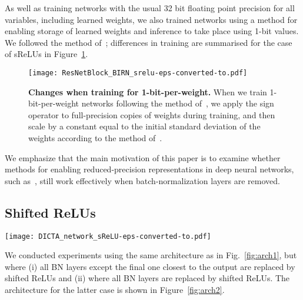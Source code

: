 \documentclass[conference]{IEEEtran}
\begin{document}
As well as training networks with the usual 32 bit floating point precision for all variables, including learned weights, we also trained networks using a method for enabling storage of learned weights and inference to take place using 1-bit values. We followed the method of~\cite{McDonnell.18}; differences in training are summarised for the case of sReLUs in Figure~\ref{fig:birn}.

\begin{figure}[h]
\begin{center}
{\texttt{[image: ResNetBlock\_BIRN\_srelu-eps-converted-to.pdf]}}
\end{center}
\caption{{\bf  Changes when training for 1-bit-per-weight.} When we train 1-bit-per-weight networks following the method of~\cite{McDonnell.18}, we apply the sign operator to full-precision copies of weights during training, and then scale by a constant equal to the initial standard deviation of the weights according to the method of~\cite{He.15}.}\label{fig:birn}
\end{figure}

We emphasize that the main motivation of this paper is to examine whether methods for enabling reduced-precision representations in deep neural networks, such as~\cite{McDonnell.18}, still work effectively when batch-normalization layers are removed. 


\subsection{Shifted ReLUs}

\begin{figure*}[ht]
\begin{center}
{\texttt{[image: DICTA\_network\_sReLU-eps-converted-to.pdf]}}
\end{center}
\caption{{\bf  Wide ResNet architecture for CIFAR when all BN layers are replaced by sReLUs.} The architecture is identical to that of Figure~\ref{fig:arch1} except that (i) all BNs have been removed and ReLUs have been replaced by shifted ReLUs (sRELU); (ii) a scale layer (multiplies all inputs by a constant) has been inserted before the global average pooling (GAP) layer; and (iii) the input is now normalized using pre-preprocessing applied to each of the RGB channels.}\label{fig:arch2}
\end{figure*}

We conducted experiments using the same architecture as in Fig.~\ref{fig:arch1}, but where  (i) all BN layers except the final one closest to the output are replaced by shifted ReLUs and (ii) where all BN layers are replaced by shifted ReLUs. The architecture for the latter case is shown in Figure~\ref{fig:arch2}.
\end{document}
